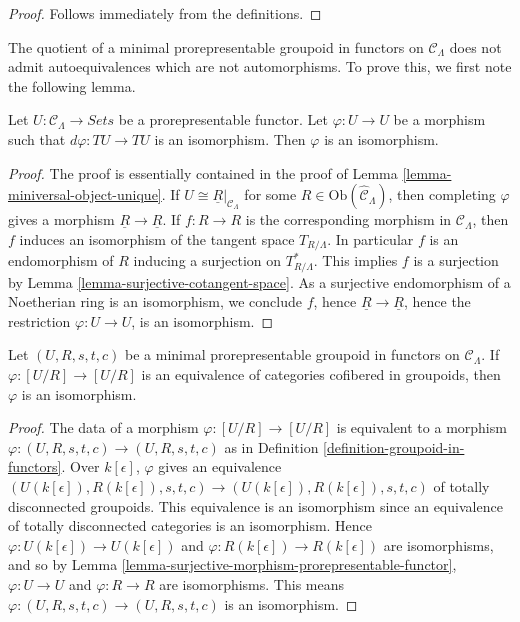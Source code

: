 \begin{proof}
Follows immediately from the definitions.
\end{proof}

\noindent
The quotient of a minimal prorepresentable groupoid in functors on $\mathcal 
C_\Lambda$ does not admit autoequivalences which are not automorphisms.  To 
prove this, we first note the following lemma.

\begin{lemma}
\label{lemma-surjective-morphism-prorepresentable-functor}
Let $U: \mathcal{C}_\Lambda \to \textit{Sets}$ be a 
prorepresentable functor.  Let $\varphi: U \to U$ be a morphism such 
that $d\varphi: TU \to TU$ is an isomorphism.  Then $\varphi$ is an 
isomorphism.
\end{lemma}

\begin{proof}
The proof is essentially contained in the proof of Lemma 
\ref{lemma-miniversal-object-unique}. If $U \cong \underline{R}|_{\mathcal 
C_\Lambda}$ for some $R \in \text{Ob}(\widehat{\mathcal{C}}_\Lambda)$, 
then completing $\varphi$ gives a morphism $\underline{R} \to 
\underline{R}$.  If $f: R \to R$ is the corresponding morphism in 
$\mathcal{C}_\Lambda$, then $f$ induces an isomorphism of the tangent space 
$T_{R/\Lambda}$.  In particular $f$ is an endomorphism of $R$ inducing a 
surjection on $T^*_{R/\Lambda}$.  This implies $f$ is a surjection by Lemma 
\ref{lemma-surjective-cotangent-space}. As a surjective endomorphism of a 
Noetherian ring is an isomorphism, we conclude $f$, hence $\underline{R} 
\to \underline{R}$, hence the restriction $\varphi: U \to U$, 
is an isomorphism.
\end{proof}

\begin{lemma}
\label{lemma-minimal-prorepresentable-groupoid-autoequivalence}
Let $(U,R,s,t,c)$ be a minimal prorepresentable groupoid in functors on 
$\mathcal{C}_\Lambda$.  If $\varphi: [U/R] \to [U/R]$ is an 
equivalence of categories cofibered in groupoids, then $\varphi$ is an 
isomorphism.
\end{lemma}

\begin{proof}
The data of a morphism $\varphi: [U/R] \to [U/R]$ is equivalent to a 
morphism $\varphi: (U,R,s,t,c) \to (U,R,s,t,c)$ as in Definition 
\ref{definition-groupoid-in-functors}.  Over $k[\epsilon]$, $\varphi$ gives 
an equivalence $(U(k[\epsilon]),R(k[\epsilon]), s,t,c) \to 
(U(k[\epsilon]),R(k[\epsilon]), s,t,c)$ of totally disconnected 
groupoids.  This equivalence is an isomorphism since an equivalence of totally 
disconnected categories is an isomorphism. Hence $\varphi: U(k[\epsilon]) 
\to U(k[\epsilon])$ and $\varphi: R(k[\epsilon]) \to 
R(k[\epsilon])$ are isomorphisms, and so by Lemma 
\ref{lemma-surjective-morphism-prorepresentable-functor}, $\varphi: U 
\to U$ and $\varphi: R \to R$ are isomorphisms.  This means 
$\varphi: (U,R,s,t,c) \to (U,R,s,t,c)$ is an isomorphism.
\end{proof}

